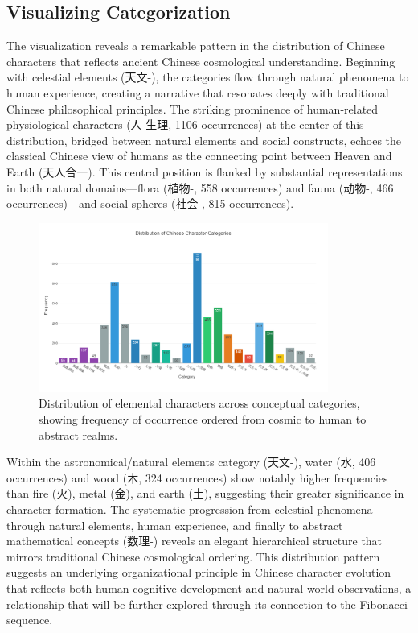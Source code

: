\documentclass[11pt,letterpaper]{article}
\begin{document}
\subsection{Visualizing
Categorization}\label{visualizing-categorization}

The visualization reveals a remarkable pattern in the distribution of
Chinese characters that reflects ancient Chinese cosmological
understanding. Beginning with celestial elements (天文-), the categories
flow through natural phenomena to human experience, creating a narrative
that resonates deeply with traditional Chinese philosophical principles.
The striking prominence of human-related physiological characters
(人-生理, 1106 occurrences) at the center of this distribution, bridged
between natural elements and social constructs, echoes the classical
Chinese view of humans as the connecting point between Heaven and Earth
(天人合一). This central position is flanked by substantial
representations in both natural domains---flora (植物-, 558 occurrences)
and fauna (动物-, 466 occurrences)---and social spheres (社会-, 815
occurrences).

\begin{figure}
\centering
\includegraphics[width=0.85\textwidth]{./images/zi_category_histogram.png}
\caption{Distribution of elemental characters across conceptual
categories, showing frequency of occurrence ordered from cosmic to human
to abstract realms.}
\end{figure}

Within the astronomical/natural elements category (天文-), water (水,
406 occurrences) and wood (木, 324 occurrences) show notably higher
frequencies than fire (火), metal (金), and earth (土), suggesting their
greater significance in character formation. The systematic progression
from celestial phenomena through natural elements, human experience, and
finally to abstract mathematical concepts (数理-) reveals an elegant
hierarchical structure that mirrors traditional Chinese cosmological
ordering. This distribution pattern suggests an underlying
organizational principle in Chinese character evolution that reflects
both human cognitive development and natural world observations, a
relationship that will be further explored through its connection to the
Fibonacci sequence.
\end{document}
